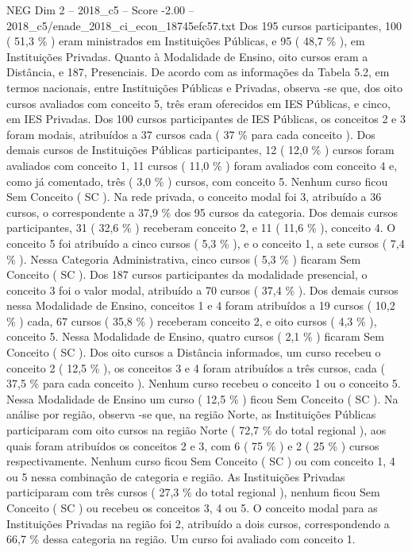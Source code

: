 \begin{textsample}{NEG Dim 2 – 2018\_c5 – Score -2.00 – 2018\_c5/enade\_2018\_ci\_econ\_18745efc57.txt}
Dos 195 cursos participantes, 100 ( 51,3 \% ) eram ministrados em Instituições Públicas, e 95 ( 48,7 \% ), em Instituições Privadas.
Quanto à Modalidade de Ensino, oito cursos eram a Distância, e 187, Presenciais.
De acordo com as informações da Tabela 5.2, em termos nacionais, entre Instituições Públicas e Privadas, observa -se que, dos oito cursos avaliados com conceito 5, três eram oferecidos em IES Públicas, e cinco, em IES Privadas.
Dos 100 cursos participantes de IES Públicas, os conceitos 2 e 3 foram modais, atribuídos a 37 cursos cada ( 37 \% para cada conceito ).
Dos demais cursos de Instituições Públicas participantes, 12 ( 12,0 \% ) cursos foram avaliados com conceito 1, 11 cursos ( 11,0 \% ) foram avaliados com conceito 4 e, como já comentado, três ( 3,0 \% ) cursos, com conceito 5.
Nenhum curso ficou Sem Conceito ( SC ).
Na rede privada, o conceito modal foi 3, atribuído a 36 cursos, o correspondente a 37,9 \% dos 95 cursos da categoria.
Dos demais cursos participantes, 31 ( 32,6 \% ) receberam conceito 2, e 11 ( 11,6 \% ), conceito 4.
O conceito 5 foi atribuído a cinco cursos ( 5,3 \% ), e o conceito 1, a sete cursos ( 7,4 \% ).
Nessa Categoria Administrativa, cinco cursos ( 5,3 \% ) ficaram Sem Conceito ( SC ).
Dos 187 cursos participantes da modalidade presencial, o conceito 3 foi o valor modal, atribuído a 70 cursos ( 37,4 \% ).
Dos demais cursos nessa Modalidade de Ensino, conceitos 1 e 4 foram atribuídos a 19 cursos ( 10,2 \% ) cada, 67 cursos ( 35,8 \% ) receberam conceito 2, e oito cursos ( 4,3 \% ), conceito 5.
Nessa Modalidade de Ensino, quatro cursos ( 2,1 \% ) ficaram Sem Conceito ( SC ).
Dos oito cursos a Distância informados, um curso recebeu o conceito 2 ( 12,5 \% ), os conceitos 3 e 4 foram atribuídos a três cursos, cada ( 37,5 \% para cada conceito ).
Nenhum curso recebeu o conceito 1 ou o conceito 5.
Nessa Modalidade de Ensino um curso ( 12,5 \% ) ficou Sem Conceito ( SC ).
Na análise por região, observa -se que, na região Norte, as Instituições Públicas participaram com oito cursos na região Norte ( 72,7 \% do total regional ), aos quais foram atribuídos os conceitos 2 e 3, com 6 ( 75 \% ) e 2 ( 25 \% ) cursos respectivamente.
Nenhum curso ficou Sem Conceito ( SC ) ou com conceito 1, 4 ou 5 nessa combinação de categoria e região.
As Instituições Privadas participaram com três cursos ( 27,3 \% do total regional ), nenhum ficou Sem Conceito ( SC ) ou recebeu os conceitos 3, 4 ou 5.
O conceito modal para as Instituições Privadas na região foi 2, atribuído a dois cursos, correspondendo a 66,7 \% dessa categoria na região.
Um curso foi avaliado com conceito 1.

\end{textsample}
